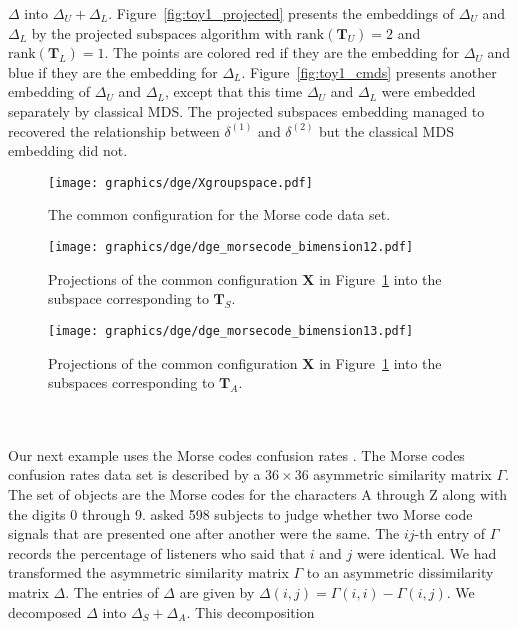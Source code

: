 $\Delta$ into $\Delta_U + \Delta_L$. Figure~\ref{fig:toy1_projected}
presents the embeddings of $\Delta_U$ and $\Delta_L$
by the projected subspaces algorithm with $\mathrm{rank}(\mathbf{T}_U)
= 2$ and $\mathrm{rank}(\mathbf{T}_L) = 1$. The points are colored red
if they are the embedding for $\Delta_U$ and blue if they are the
embedding for $\Delta_L$. Figure~\ref{fig:toy1_cmds} presents 
another embedding of $\Delta_U$ and $\Delta_L$, except that
this time $\Delta_U$ and $\Delta_L$ were embedded separately by
classical MDS. The projected subspaces embedding managed to recovered
the relationship between $\delta^{(1)}$ and $\delta^{(2)}$ but the
classical MDS embedding did not.
\begin{figure}[htbp]
  \centering
    \texttt{[image: graphics/dge/Xgroupspace.pdf]}
    \caption{The common configuration for the Morse code
    data set.}
  \label{fig:morsecode3d}
\end{figure}
\begin{figure}[htbp]
  \centering
  \texttt{[image: graphics/dge/dge\_morsecode\_bimension12.pdf]}
  \caption{Projections of the common configuration $\mathbf{X}$ in
    Figure~\ref{fig:morsecode3d} into the subspace corresponding to
    $\mathbf{T}_S$.}
  \label{fig:morsecode2a}
\end{figure}
\begin{figure}
  \centering
  \texttt{[image: graphics/dge/dge\_morsecode\_bimension13.pdf]}
  \caption{Projections of the common configuration $\mathbf{X}$ in
    Figure~\ref{fig:morsecode3d} into the subspaces corresponding to
    $\mathbf{T}_A$. }
  \label{fig:morsecode2b}
\end{figure}
\\ \\ \noindent Our next example uses the Morse codes confusion rates
\citep{rothkopf57}. The Morse codes confusion rates data set is
described by a $36 \times 36$ asymmetric similarity matrix
$\Gamma$. The set of objects are the Morse codes for the characters A
through Z along with the digits 0 through 9. \citet{rothkopf57} asked
598 subjects to judge whether two Morse code signals that are
presented one after another were the same. The $ij$-th entry of
$\Gamma$ records the percentage of listeners who said that $i$ and $j$
were identical. We had transformed the asymmetric similarity matrix
$\Gamma$ to an asymmetric dissimilarity matrix $\Delta$. The entries
of $\Delta$ are given by $\Delta(i,j) = \Gamma(i,i) - \Gamma(i,j)$. We
decomposed $\Delta$ into $\Delta_S + \Delta_{A}$. This decomposition
